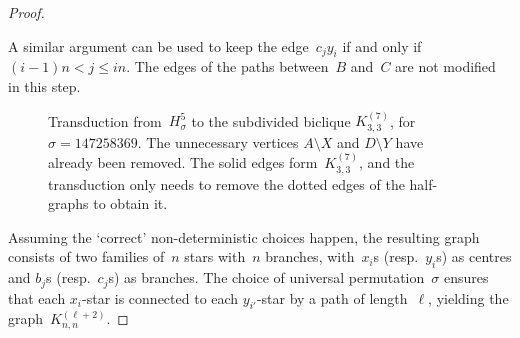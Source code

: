 \documentclass[a4paper,UKenglish,cleveref,thm-restate]{lipics-v2021}
\theoremstyle{remark}
\begin{document}
\begin{proof}
\begin{itemize}
        A similar argument can be used to keep the edge~$c_jy_i$ if and only if $(i-1)n < j \le in$.
        The edges of the paths between~$B$ and~$C$ are not modified in this step.
    \end{itemize}
    
\begin{figure}[tb]
    \centering
    \caption{Transduction from~$H_\sigma^5$ to the subdivided biclique $K_{3,3}^{(7)}$, for $\sigma = 147258369$.
        The unnecessary vertices $A \setminus X$ and $D \setminus Y$ have already been removed.
        The solid edges form~$K_{3,3}^{(7)}$, and the transduction only needs to remove the dotted edges of the half-graphs to obtain it.
    }
    \label{fig:halfgraph-longpath-transduction}
\end{figure}

    Assuming the `correct' non-deterministic choices happen,
    the resulting graph consists of two families of~$n$ stars with~$n$ branches, with~$x_i$s (resp.~$y_i$s) as centres and $b_j$s (resp.~$c_j$s) as branches.
    The choice of universal permutation~$\sigma$ ensures that each $x_i$-star is connected to each $y_{i'}$-star by a path of length~$\ell$, yielding the graph~$K_{n,n}^{(\ell+2)}$.
\end{proof}
\end{document}
